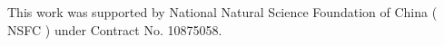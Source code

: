 
\begin{acknowledgement}
This work was supported by National Natural Science Foundation of
China ( NSFC ) under Contract No. 10875058.
\end{acknowledgement}





